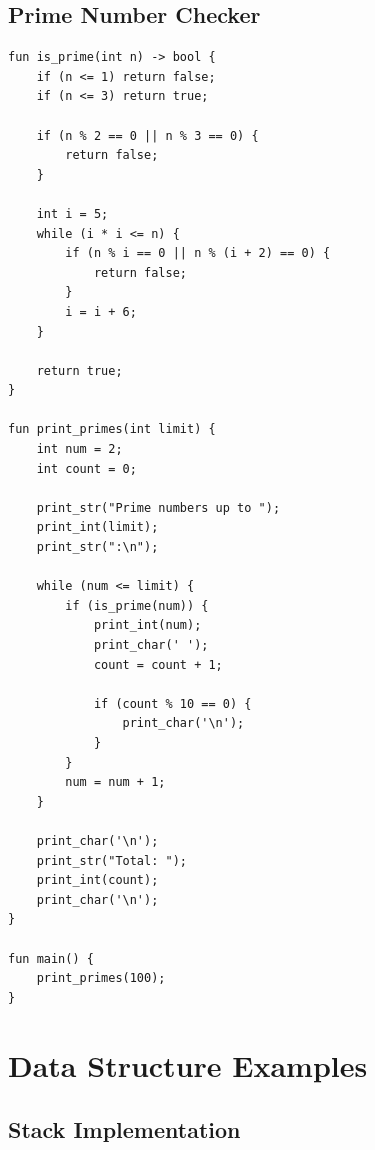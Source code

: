 \documentclass[12pt,a4paper,oneside]{book}
\begin{document}
\subsection{Prime Number Checker}

\begin{lstlisting}[style=algo, caption={Prime Number Detection}]
fun is_prime(int n) -> bool {
    if (n <= 1) return false;
    if (n <= 3) return true;
    
    if (n % 2 == 0 || n % 3 == 0) {
        return false;
    }
    
    int i = 5;
    while (i * i <= n) {
        if (n % i == 0 || n % (i + 2) == 0) {
            return false;
        }
        i = i + 6;
    }
    
    return true;
}

fun print_primes(int limit) {
    int num = 2;
    int count = 0;
    
    print_str("Prime numbers up to ");
    print_int(limit);
    print_str(":\n");
    
    while (num <= limit) {
        if (is_prime(num)) {
            print_int(num);
            print_char(' ');
            count = count + 1;
            
            if (count % 10 == 0) {
                print_char('\n');
            }
        }
        num = num + 1;
    }
    
    print_char('\n');
    print_str("Total: ");
    print_int(count);
    print_char('\n');
}

fun main() {
    print_primes(100);
}
\end{lstlisting}

\section{Data Structure Examples}

\subsection{Stack Implementation}
\end{document}
